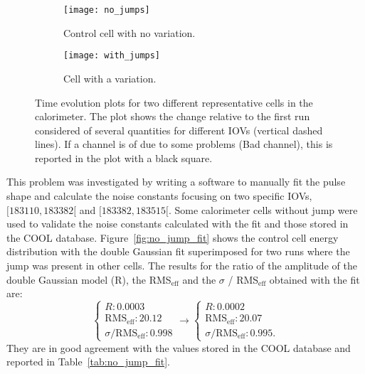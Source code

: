 \begin{figure}[!h]
  \centering
  \begin{subfigure}[t]{.7\linewidth}
    \texttt{[image: no\_jumps]}
    \caption{Control cell with no variation.}
    \label{fig:no_jumps}
  \end{subfigure}

  \begin{subfigure}[t]{.7\linewidth}
    \texttt{[image: with\_jumps]}
    \caption{Cell with a variation.}
    \label{fig:with_jumps}
  \end{subfigure}
  \caption{Time evolution plots for two different representative cells in the
    calorimeter. The plot shows the change relative to the first run considered
    of several quantities for different IOVs (vertical dashed lines). If a
    channel is of due to some problems (Bad channel), this is reported in the
    plot with a black square.}
  \label{fig:jumps}
\end{figure}

This problem was investigated by writing a software to manually fit the pulse
shape and calculate the noise constants focusing on two specific IOVs,
$[183110, 183382[$ and $[183382, 183515[$. Some calorimeter cells without jump
were used to validate the noise constants calculated with the fit and those
stored in the COOL database. Figure~\ref{fig:no_jump_fit} shows the control cell
energy distribution with the double Gaussian fit superimposed for two runs where
the jump was present in other cells. The results for the ratio of the amplitude
of the double Gaussian model (R), the RMS$_{\text{eff}}$ and the $\sigma$ /
RMS$_{\text{eff}}$ obtained with the fit are:
\begin{equation}
  \begin{cases}
    R : 0.0003 \\
    \text{RMS}_{\text{eff}}: 20.12 \\
    \sigma / \text{RMS}_{\text{eff}}: 0.998
  \end{cases}
  \to
  \begin{cases}
    R : 0.0002 \\
    \text{RMS}_{\text{eff}} : 20.07 \\
    \sigma / \text{RMS}_{\text{eff}}: 0.995.
  \end{cases}
  \label{eq:74}
\end{equation}
They are in good agreement with the values stored in the COOL database and
reported in Table~\ref{tab:no_jump_fit}.

